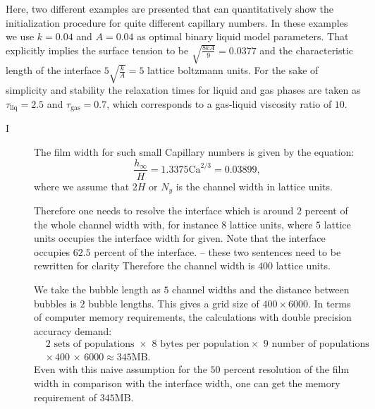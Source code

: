 \documentclass{article}
\newcommand{\Ca}{\mathrm{Ca}}
\newcommand{\todo}[1]{{\color{red}#1}}
\begin{document}
Here, two different examples are presented that can quantitatively show the
initialization procedure for quite different capillary numbers. In these
examples we use $k=0.04$ and $A=0.04$ as optimal binary liquid model parameters.
That explicitly implies the surface tension to be $\sqrt{\frac{8 k
A}{9}}=0.0377$ and the characteristic length of the interface
$5\sqrt{\frac{k}{A}}=5$ lattice boltzmann units. For the sake of simplicity and
stability the relaxation times for liquid and gas phases are taken as
$\tau_{\mathrm{liq}}=2.5$ and $\tau_{\mathrm{gas}}=0.7$, which corresponds
to a gas-liquid viscosity ratio of $10$.
\begin{description}
 \item[I ]
  The film width for such small Capillary numbers \cite{bretherton} is
given by the equation:
  \begin{equation}
  \frac{h_{\infty}}{H}=1.3375 \Ca^{2/3}=0.03899,
  \end{equation}
  where we assume that $2 H$ or $N_y$ is the channel width in lattice units.

\todo{Therefore one needs to resolve the interface which is around $2$ percent of
the  whole channel width with, for instance $8$ lattice units, where $5$ lattice
units occupies the interface width for given. Note that the interface occupies
$62.5$ percent of the interface. -- these two sentences need to be rewritten for clarity}  Therefore the channel
  width is $400$ lattice units.

  We take the bubble length as $5$ channel widths
  and the distance between bubbles is $2$ bubble lengths. This gives a
grid size of $400 \times 6000$. In terms of computer memory
requirements, the calculations with double precision accuracy demand:
\begin{equation}
\begin{aligned}
&2\text{ sets of populations } \times \,\, 8\,\, \text{bytes per population
} \times \,\, 9 \text{ number of
populations}\\
&\times\,400\,\times\,6000\approx 345 \mathrm{MB}. 
\end{aligned}
\end{equation}
Even with this naive assumption for the $50$ percent resolution of the film
width in comparison with the interface width, one can get the memory
requirement of $345 \mathrm{MB}$. 


\end{description}
\end{document}
